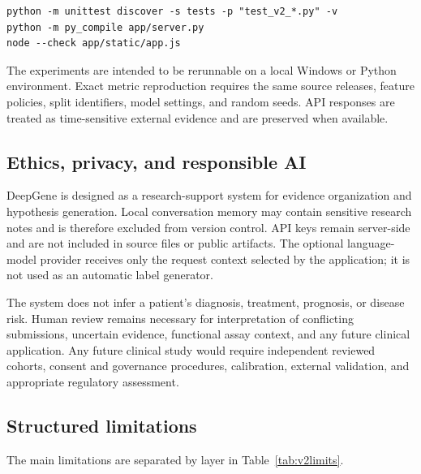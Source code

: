 \documentclass[12pt,a4paper]{article}
\begin{document}
\begin{lstlisting}
python -m unittest discover -s tests -p "test_v2_*.py" -v
python -m py_compile app/server.py
node --check app/static/app.js
\end{lstlisting}

The experiments are intended to be rerunnable on a local Windows or Python
environment. Exact metric reproduction requires the same source releases,
feature policies, split identifiers, model settings, and random seeds. API
responses are treated as time-sensitive external evidence and are preserved
when available.

\subsection{Ethics, privacy, and responsible AI}
DeepGene is designed as a research-support system for evidence organization
and hypothesis generation. Local conversation memory may contain sensitive
research notes and is therefore excluded from version control. API keys remain
server-side and are not included in source files or public artifacts. The
optional language-model provider receives only the request context selected by
the application; it is not used as an automatic label generator.

The system does not infer a patient's diagnosis, treatment, prognosis, or
disease risk. Human review remains necessary for interpretation of conflicting
submissions, uncertain evidence, functional assay context, and any future
clinical application. Any future clinical study would require independent
reviewed cohorts, consent and governance procedures, calibration, external
validation, and appropriate regulatory assessment.

\subsection{Structured limitations}
The main limitations are separated by layer in Table~\ref{tab:v2limits}.
\end{document}
